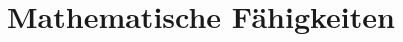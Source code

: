 \documentclass[a4paper]{article}
\begin{document}
\subsubsection{}

\subsubsection{}

\subsubsection{}

\subsubsection{}



\section{Mathematische Fähigkeiten}

\subsection{}

\subsubsection{}
\end{document}
